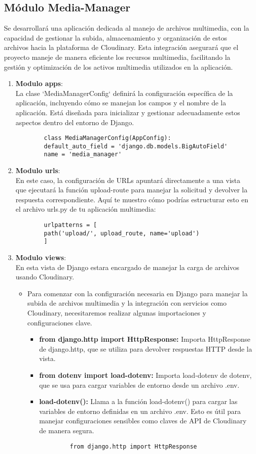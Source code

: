\subsection*{Módulo Media-Manager}
Se desarrollará una aplicación dedicada al manejo de archivos multimedia, con la capacidad de gestionar la subida, almacenamiento y organización de estos archivos hacia la plataforma de Cloudinary. Esta integración asegurará que el proyecto maneje de manera eficiente los recursos multimedia, facilitando la gestión y optimización de los activos multimedia utilizados en la aplicación.
\begin{enumerate}
	\item \textbf{Modulo apps}: \\
	La clase `MediaManagerConfig` definirá la configuración específica de la aplicación, incluyendo cómo se manejan los campos y el nombre de la aplicación. Está diseñada para inicializar y gestionar adecuadamente estos aspectos dentro del entorno de Django.
	\begin{verbatim}
		class MediaManagerConfig(AppConfig):
		default_auto_field = 'django.db.models.BigAutoField'
		name = 'media_manager'
	\end{verbatim}	
	\item \textbf{Modulo urls}: \\
	En este caso, la configuración de URLs apuntará directamente a una vista que ejecutará la función upload-route para manejar la solicitud y devolver la respuesta correspondiente. Aquí te muestro cómo podrías estructurar esto en el archivo urls.py de tu aplicación multimedia:
	\begin{verbatim}
		urlpatterns = [
		path('upload/', upload_route, name='upload')
		]
	\end{verbatim}
	\item \textbf{Modulo views}: \\
	En esta vista de Django estara encargado de manejar la carga de archivos usando Cloudinary. 
	\begin{itemize}
		\item Para comenzar con la configuración necesaria en Django para manejar la subida de archivos multimedia y la integración con servicios como Cloudinary, necesitaremos realizar algunas importaciones y configuraciones clave. 
		\begin{itemize}
			\item \textbf{from django.http import HttpResponse:} Importa HttpResponse de django.http, que se utiliza para devolver respuestas HTTP desde la vista.
			\item \textbf{from dotenv import load-dotenv:} Importa load-dotenv de dotenv, que se usa para cargar variables de entorno desde un archivo .env.
			\item \textbf{load-dotenv():} Llama a la función load-dotenv() para cargar las variables de entorno definidas en un archivo .env. Esto es útil para manejar configuraciones sensibles como claves de API de Cloudinary de manera segura.
		\end{itemize}
		\begin{verbatim}
			from django.http import HttpResponse
			

\end{verbatim}
\end{itemize}
\end{enumerate}
